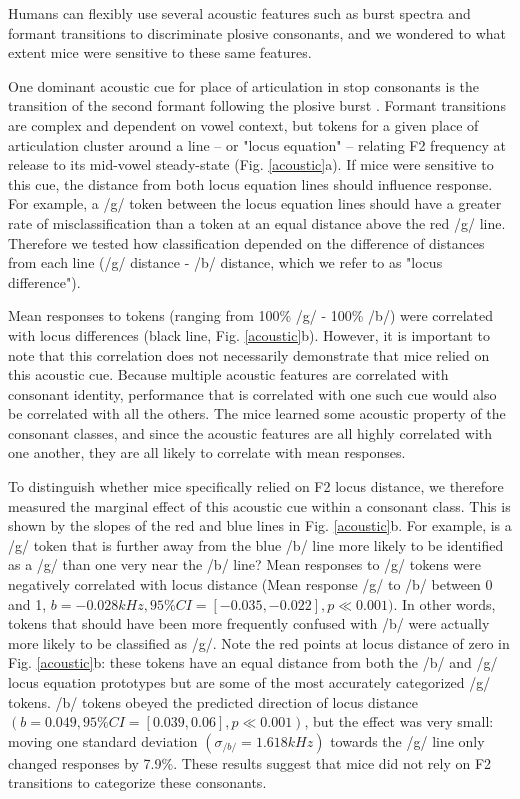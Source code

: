 Humans can flexibly use several acoustic features such as burst spectra and formant transitions to discriminate plosive consonants, and we wondered to what extent mice were sensitive to these same features.

One dominant acoustic cue for place of articulation in stop consonants is the transition of the second formant following the plosive burst \citep{Wright2004,Sussman1998,Lindblom2012}. Formant transitions are complex and dependent on vowel context, but tokens for a given place of articulation cluster around a line -- or "locus equation" -- relating F2 frequency at release to its mid-vowel steady-state \citep{Sussman1998,Lindblom2012} (Fig. \ref{acoustic}a).  If mice were sensitive to this cue, the distance from both locus equation lines should influence response. For example, a /g/ token between the locus equation lines should have a greater rate of misclassification than a token at an equal distance above the red /g/ line. Therefore we tested how classification depended on the difference of distances from each line (/g/ distance - /b/ distance, which we refer to as "locus difference").

Mean responses to tokens (ranging from 100\% /g/ - 100\% /b/) were correlated with locus differences (black line, Fig. \ref{acoustic}b). However, it is important to note that this correlation does not necessarily demonstrate that mice relied on this acoustic cue. Because multiple acoustic features are correlated with consonant identity, performance that is correlated with one such cue would also be correlated with all the others. The mice learned some acoustic property of the consonant classes, and since the acoustic features are all highly correlated with one another, they are all likely to correlate with mean responses.

To distinguish whether mice specifically relied on F2 locus distance, we therefore measured the marginal effect of this acoustic cue within a consonant class. This is shown by the slopes of the red and blue lines in Fig. \ref{acoustic}b. For example, is a /g/ token that is further away from the blue /b/ line more likely to be identified as a /g/ than one very near the /b/ line? Mean responses to /g/ tokens were negatively correlated with locus distance (Mean response /g/ to /b/ between 0 and 1, $b=-0.028kHz, 95\% CI = [-0.035, -0.022], p \ll 0.001)$. In other words, tokens that should have been more frequently confused with /b/ were actually more likely to be classified as /g/. Note the red points at locus distance of zero in Fig. \ref{acoustic}b: these tokens have an equal distance from both the /b/ and /g/ locus equation prototypes but are some of the most accurately categorized /g/ tokens. /b/ tokens obeyed the predicted direction of locus distance $ (b=0.049, 95\% CI = [0.039, 0.06], p \ll 0.001) $, but the effect was very small: moving one standard deviation $ (\sigma_{/b/}=1.618kHz) $ towards the /g/ line only changed responses by 7.9\%. These results suggest that mice did not rely on F2 transitions to categorize these consonants.

